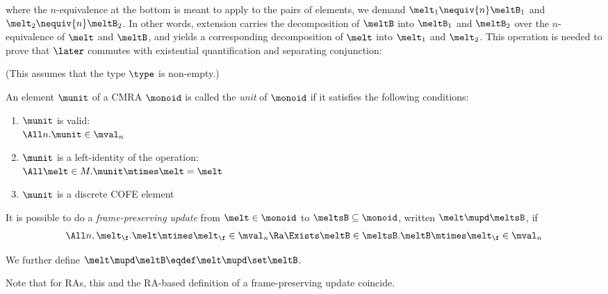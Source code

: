 \begin{center}
\end{center}
where the $n$-equivalence at the bottom is meant to apply to the pairs of elements, \ie we demand $\melt_1 \nequiv{n} \meltB_1$ and $\melt_2 \nequiv{n} \meltB_2$.
In other words, extension carries the decomposition of $\meltB$ into $\meltB_1$ and $\meltB_2$ over the $n$-equivalence of $\melt$ and $\meltB$, and yields a corresponding decomposition of $\melt$ into $\melt_1$ and $\melt_2$.
This operation is needed to prove that $\later$ commutes with existential quantification and separating conjunction:
(This assumes that the type $\type$ is non-empty.)

\begin{defn}
  An element $\munit$ of a CMRA $\monoid$ is called the \emph{unit} of $\monoid$ if it satisfies the following conditions:
  \begin{enumerate}[itemsep=0pt]
  \item $\munit$ is valid: \\ $\All n. \munit \in \mval_n$
  \item $\munit$ is a left-identity of the operation: \\
    $\All \melt \in M. \munit \mtimes \melt = \melt$
  \item $\munit$ is a discrete COFE element
  \end{enumerate}
\end{defn}

\begin{defn}
  It is possible to do a \emph{frame-preserving update} from $\melt \in \monoid$ to $\meltsB \subseteq \monoid$, written $\melt \mupd \meltsB$, if
  \[ \All n, \melt_\f. \melt \mtimes \melt_\f \in \mval_n \Ra \Exists \meltB \in \meltsB. \meltB \mtimes \melt_\f \in \mval_n \]

  We further define $\melt \mupd \meltB \eqdef \melt \mupd \set\meltB$.
\end{defn}
Note that for RAs, this and the RA-based definition of a frame-preserving update coincide.

